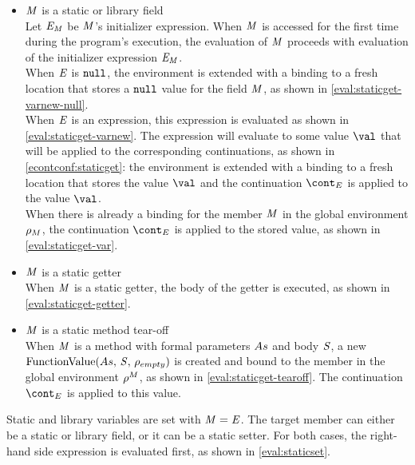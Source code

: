 \documentclass[a4paper,oneside]{article}
\begin{document}
\begin{itemize}
    \item $\mathit{M}$ is a static or library field\\
        Let $\mathit{E}_{\mathit{M}}$ be $\mathit{M}$'s initializer expression.
        When $\mathit{M}$ is accessed for the first time during the program's execution, the evaluation of $\mathit{M}$ proceeds with evaluation of the initializer expression $\mathit{E}_{\mathit{M}}$.\\
        When $\mathit{E}$ is $\tt{null}$, the environment is extended with a binding to a fresh location that stores a $\tt{null}$ value for the field $\mathit{M}$, as shown in \eqref{eval:staticget-varnew-null}.\\
        When $\mathit{E}$ is an expression, this expression is evaluated as shown in \eqref{eval:staticget-varnew}.
        The expression will evaluate to some value $\val$ that will be applied to the corresponding continuations, as shown in \eqref{econtconf:staticget}: the environment is extended with a binding to a fresh location that stores the value $\val$ and the continuation $\econt$ is applied to the value $\val$.\\
        When there is already a binding for the member $\mathit{M}$ in the global environment $\rho_{M}$, the continuation $\econt$ is applied to the stored value, as shown in \eqref{eval:staticget-var}.

    \item $\mathit{M}$ is a static getter\\
        When $\mathit{M}$ is a static getter, the body of the getter is executed, as shown in \eqref{eval:staticget-getter}.

    \item $\mathit{M}$ is a static method tear-off\\
        When $\mathit{M}$ is a method with formal parameters $As$ and body $\mathit{S}$, a new $\mathrm{FunctionValue}({As},\,{\mathit{S}},\,{\rho_{empty}})$ is created and bound to the member in the global environment $\rho^{M}$, as shown in \eqref{eval:staticget-tearoff}.
        The continuation $\econt$ is applied to this value.

\end{itemize}

Static and library variables are set with $\mathit{M}=\mathit{E}$.
The target member can either be a static or library field, or it can be a static setter. For both cases, the right-hand side expression is evaluated first, as shown in \eqref{eval:staticset}.
\end{document}
